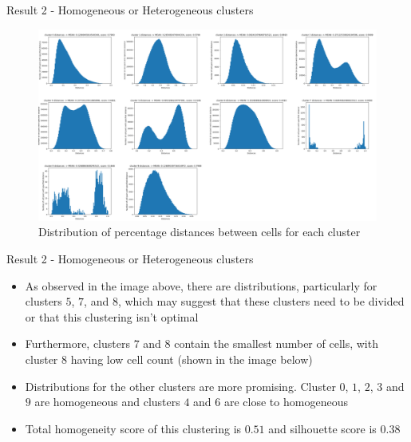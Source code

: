 \documentclass{beamer}
\begin{document}
\begin{frame}{Result 2 - Homogeneous or Heterogeneous clusters}

\begin{figure}
    \centering
    \includegraphics[width=1\textwidth]{stats_clusters4.png}
    \caption{Distribution of percentage distances between cells for each cluster}
\end{figure} 

\end{frame}
\begin{frame}{Result 2 - Homogeneous or Heterogeneous clusters}

\begin{itemize}
    \item<1->  As observed in the image above, there are distributions, particularly for clusters $5$, $7$, and $8$, which may suggest that these clusters need to be divided or that this clustering isn't optimal
    \item<2->  Furthermore, clusters $7$ and $8$ contain the smallest number of cells, with cluster $8$ having low cell count (shown in the image below)
    \item<3->  Distributions for the other clusters are more promising. Cluster $0$, $1$, $2$, $3$ and $9$ are homogeneous and clusters $4$ and $6$ are close to homogeneous
    \item<4->  Total homogeneity score of this clustering is $0.51$ and silhouette score is $0.38$
\end{itemize}
\end{frame}
\end{document}
